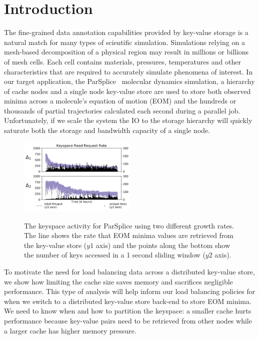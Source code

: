 \section{Introduction}
\label{sec:introduction}

The fine-grained data annotation capabilities provided by key-value storage is
a natural match for many types of scientific simulation. Simulations relying on
a mesh-based decomposition of a physical region may result in millions or
billions of mesh cells. Each cell contains materials, pressures, temperatures
and other characteristics that are required to accurately simulate phenomena of
interest. In our target application, the
ParSplice~\cite{perez:jctc20150parsplice} molecular dynamics simulation, a
hierarchy of cache nodes and a single node key-value store are used to store
both observed minima across a molecule's equation of motion (EOM) and the
hundreds or thousands of partial trajectories calculated each second during a
parallel job. Unfortunately, if we scale the system the IO to the storage
hierarchy will quickly saturate both the storage and bandwidth capacity of a
single node. 

\begin{figure}[t]
  \noindent\includegraphics[width=0.5\textwidth]{figures/motivation-regimes.png}\\

  \caption{The keyspace activity for ParSplice using two different growth
rates.  The line shows the rate that EOM minima values are retrieved from the
key-value store (\(y1\) axis) and the points along the bottom show the number
of keys accessed in a 1 second sliding window (\(y2\) axis).
\label{fig:motivation-regimes}}

\end{figure}

To motivate the need for load balancing data across a distributed key-value
store, we show how limiting the cache size saves memory and sacrifices
negligible performance. This type of analysis will help inform our load
balancing policies for when we switch to a distributed key-value store back-end
to store EOM minima. We need to know when and how to partition the keyspace: a
smaller cache hurts performance because key-value pairs need to be retrieved
from other nodes while a larger cache has higher memory pressure.

